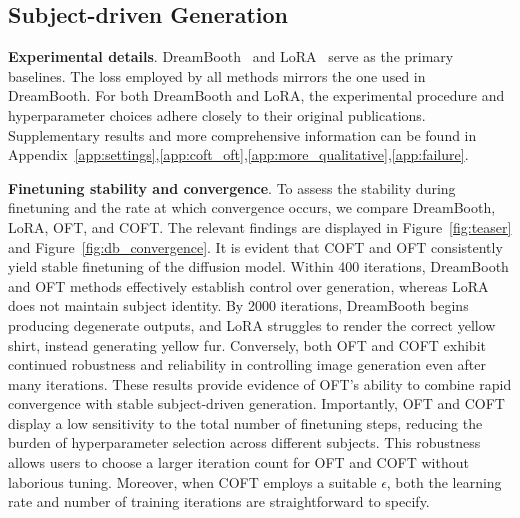\subsection{Subject-driven Generation}

\textbf{Experimental details}. DreamBooth~\cite{ruiz2023dreambooth} and LoRA~\cite{hulora2022} serve as the primary baselines. The loss employed by all methods mirrors the one used in DreamBooth. For both DreamBooth and LoRA, the experimental procedure and hyperparameter choices adhere closely to their original publications. Supplementary results and more comprehensive information can be found in Appendix~\ref{app:settings},\ref{app:coft_oft},\ref{app:more_qualitative},\ref{app:failure}.

\textbf{Finetuning stability and convergence}. To assess the stability during finetuning and the rate at which convergence occurs, we compare DreamBooth, LoRA, OFT, and COFT. The relevant findings are displayed in Figure~\ref{fig:teaser} and Figure~\ref{fig:db_convergence}. It is evident that COFT and OFT consistently yield stable finetuning of the diffusion model. Within 400 iterations, DreamBooth and OFT methods effectively establish control over generation, whereas LoRA does not maintain subject identity. By 2000 iterations, DreamBooth begins producing degenerate outputs, and LoRA struggles to render the correct yellow shirt, instead generating yellow fur. Conversely, both OFT and COFT exhibit continued robustness and reliability in controlling image generation even after many iterations. These results provide evidence of OFT’s ability to combine rapid convergence with stable subject-driven generation. Importantly, OFT and COFT display a low sensitivity to the total number of finetuning steps, reducing the burden of hyperparameter selection across different subjects. This robustness allows users to choose a larger iteration count for OFT and COFT without laborious tuning. Moreover, when COFT employs a suitable $\epsilon$, both the learning rate and number of training iterations are straightforward to specify.

